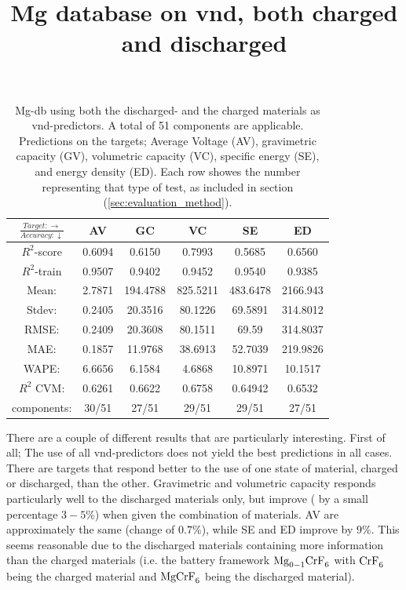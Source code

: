 \begin{table}[h]
\scriptsize
\centering
\caption{Mg-db using both the discharged- and the charged materials as vnd-predictors. A total of 51 components are applicable. Predictions on the targets; Average Voltage (AV), gravimetric capacity (GV), volumetric capacity (VC), specific energy (SE), and energy density (ED). Each row showes the number representing that type of test, as included in section (\ref{sec:evaluation_method}).}
\title{Mg database on vnd, both charged and discharged}
\begin{tabular}{|c|c|c|c|c|c|}
	\hline 
	$\frac{Target: \rightarrow}{Accuracy:\downarrow} $ & AV & GC & VC & SE & ED 
	 \\ 
	\hline
	$R^2$-score 	& 0.6094 & 0.6150 & 0.7993 & 0.5685 &  0.6560\\ 
	\hline 
	$R^2$-train 	& 0.9507 & 0.9402 & 0.9452 & 0.9540 &  0.9385 \\ 
	\hline
	Mean: 	 	& 2.7871	&194.4788&825.5211&483.6478& 2166.943\\
	\hline 
	Stdev:	 	& 0.2405	&20.3516	&80.1226 	&69.5891	& 314.8012\\
	\hline 
	RMSE: 		&0.2409& 20.3608 &  80.1511 & 69.59 &314.8037\\ 
	\hline
	MAE: 		& 0.1857 & 11.9768& 38.6913 & 52.7039 & 219.9826 \\ 
	\hline
	WAPE: 		& 6.6656 & 6.1584 & 4.6868  & 10.8971 & 10.1517 \\
	\hline
	$R^2$ CVM: 	& 0.6261 	& 0.6622 	& 0.6758  	& 0.64942 &0.6532 \\
	\hline
	components: 	& 30/51 	& 27/51 	& 29/51 	 & 29/51 	&27/51 \\
	\hline
\end{tabular}
\label{tab:mg-n-iii}
\end{table}


There are a couple of different results that are particularly interesting. First of all; The use of all vnd-predictors does not yield the best predictions in all cases. There are targets that respond better to the use of one state of material, charged or discharged, than the other. Gravimetric and volumetric capacity responds particularly well to the discharged materials only, but improve ( by a small percentage  $3-5\%$) when given the combination of materials. AV are approximately the same (change of $0.7\%$), while SE and ED improve by $9\%$. This seems reasonable due to the discharged materials containing more information than the charged materials (i.e. the battery framework $\ce{Mg_{0-1}CrF_6}$ with $\ce{CrF_6}$ being the charged material and  $\ce{MgCrF_6}$ being the discharged material).

